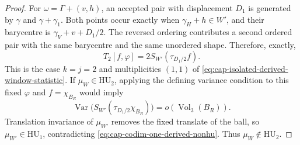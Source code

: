\documentclass[10pt,a4paper]{amsart}
\newcommand{\HU}{\mathrm{HU}}
\newcommand{\Var}{\operatorname{Var}}
\newcommand{\Vol}{\operatorname{Vol}}
\begin{document}
\begin{proof}
For $\omega=\Gamma+(v,h)$, an accepted pair with displacement $D_1$ is
generated by $\gamma$ and $\gamma+\gamma_1$.  Both points occur exactly when
$\gamma_H+h\in W'$, and their barycentre is
$\gamma_V+v+D_1/2$.  The reversed ordering contributes a second ordered pair
with the same barycentre and the same unordered shape.  Therefore, exactly,
\begin{equation}\label{eq:cap-codim-one-pair-reduction}
  T_2[f,\varphi]
  =2S_{W'}(\tau_{D_1/2}f).
\end{equation}
This is the case $k=j=2$ and multiplicities $(1,1)$ of
\eqref{eq:cap-isolated-derived-window-statistic}.
If $\mu_W\in\HU_2$, applying the defining variance condition to this fixed
$\varphi$ and $f=\chi_{B_R}$ would imply
\[
  \Var\bigl(S_{W'}(\tau_{D_1/2}\chi_{B_R})\bigr)
  =o(\Vol_3(B_R)).
\]
Translation invariance of $\mu_{W'}$ removes the fixed translate of the ball,
so $\mu_{W'}\in\HU_1$, contradicting
\eqref{eq:cap-codim-one-derived-nonhu}.  Thus
$\mu_W\notin\HU_2$.
\end{proof}
\end{document}
